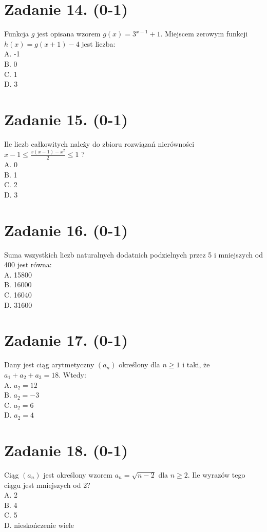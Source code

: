 \documentclass[10pt]{article}
\begin{document}
\section*{Zadanie 14. (0-1)}
Funkcja \(g\) jest opisana wzorem \(g(x)=3^{x-1}+1\). Miejscem zerowym funkcji \(h(x)=g(x+1)-4\) jest liczba:\\
A. -1\\
B. 0\\
C. 1\\
D. 3

\section*{Zadanie 15. (0-1)}
Ile liczb całkowitych należy do zbioru rozwiązań nierówności \(x-1 \leq \frac{x(x-1)-x^{2}}{2} \leq 1\) ?\\
A. 0\\
B. 1\\
C. 2\\
D. 3

\section*{Zadanie 16. (0-1)}
Suma wszystkich liczb naturalnych dodatnich podzielnych przez 5 i mniejszych od 400 jest równa:\\
A. 15800\\
B. 16000\\
C. 16040\\
D. 31600

\section*{Zadanie 17. (0-1)}
Dany jest ciąg arytmetyczny \(\left(a_{n}\right)\) określony dla \(n \geq 1\) i taki, że \(a_{1}+a_{2}+a_{3}=18\). Wtedy:\\
A. \(a_{2}=12\)\\
B. \(a_{2}=-3\)\\
C. \(a_{2}=6\)\\
D. \(a_{2}=4\)

\section*{Zadanie 18. (0-1)}
Ciąg \(\left(a_{n}\right)\) jest określony wzorem \(a_{n}=\sqrt{n-2}\) dla \(n \geq 2\). Ile wyrazów tego ciągu jest mniejszych od 2?\\
A. 2\\
B. 4\\
C. 5\\
D. nieskończenie wiele
\end{document}
